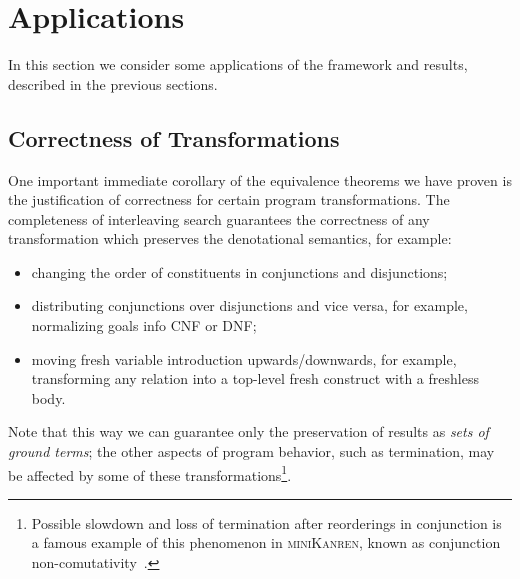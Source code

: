 \section{Applications}
\label{applications}

In this section we consider some applications of the framework and results, described in the previous sections.

\subsection{Correctness of Transformations}

One important immediate corollary of the equivalence theorems we have proven is the justification of correctness for certain program transformations.
The completeness of interleaving search guarantees the correctness of any transformation which preserves the denotational semantics,
for example:

\begin{itemize}
\item changing the order of constituents in conjunctions and disjunctions;
\item distributing conjunctions over disjunctions and vice versa, for example, normalizing goals info CNF or DNF;
\item moving fresh variable introduction upwards/downwards, for example, transforming any relation into a top-level fresh
  construct with a freshless body.
\end{itemize}

Note that this way we can guarantee only the preservation of results as \emph{sets of ground terms}; the other aspects of program behavior,
such as termination, may be affected by some of these transformations\footnote{Possible slowdown and loss of termination after reorderings in conjunction is a famous example of this phenomenon in \textsc{miniKanren}, known as conjunction non-comutativity~\cite{WillThesis}.}.

